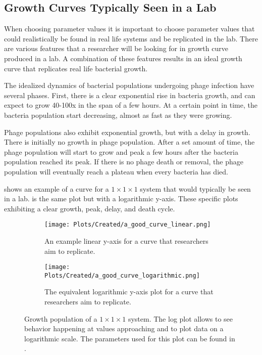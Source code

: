 \subsection{Growth Curves Typically Seen in a Lab}
\label{sec:literaturereview:growth_curves_typically_seen_in_a_lab}

When choosing parameter values it is important to choose parameter values that could realistically be found in real life systems and be replicated in the lab. 
There are various features that a researcher will be looking for in growth curve produced in a lab.
A combination of these features results in an ideal growth curve that replicates real life bacterial growth. 

The idealized dynamics of bacterial populations undergoing phage infection have several phases. First, there is a clear exponential rise in bacteria growth, and can expect to grow 40-100x in the span of a few hours. 
At a certain point in time, the bacteria population start decreasing, almost as fast as they were growing. 

Phage populations also exhibit exponential growth, but with a delay in growth. 
There is initially no growth in phage population. 
After a set amount of time, the phage population will start to grow and peak a few hours after the bacteria population reached its peak. 
If there is no phage death or removal, the phage population will eventually reach a plateau when every bacteria has died. 

 shows an example of a curve for a $1\times1\times1$ system that would typically be seen in a lab. 
 is the same plot but with a logarithmic y-axis. 
These specific plots exhibiting a clear growth, peak, delay, and death cycle. 

\begin{figure}[h!]
    \centering
    \begin{subfigure}{1\linewidth}
        \centering
        \captionsetup{width=1\linewidth}
        \texttt{[image: Plots/Created/a\_good\_curve\_linear.png]}
        \caption{
            An example linear y-axis for a curve that researchers aim to replicate. 
        }
        \label{fig:created:a_good_curve_linear}
    \end{subfigure}
    \hfill
    \begin{subfigure}{1\linewidth}
        \centering
        \captionsetup{width=1\linewidth}
        \texttt{[image: Plots/Created/a\_good\_curve\_logarithmic.png]}
        \caption{
            The equivalent logarithmic y-axis plot for a curve that researchers aim to replicate. 
        }
        \label{fig:created:a_good_curve_logarithmic}
    \end{subfigure}
    \caption{
        Growth population of a $1\times1\times1$ system. 
        The log plot allows to see behavior happening at values approaching and to plot data on a logarithmic scale. 
        The parameters used for this plot can be found in . 
    }
    \label{fig:created:a_good_curve}
\end{figure}

